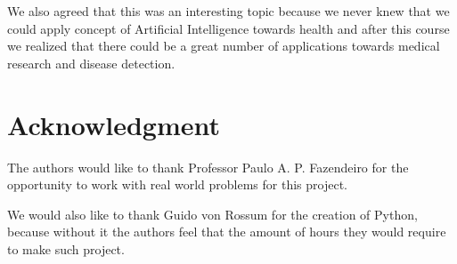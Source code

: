 \documentclass[conference]{IEEEtran}
\begin{document}
We also agreed that this was an interesting topic because we never knew that we
could apply concept of Artificial Intelligence towards health and after this
course we realized that there could be a great number of applications towards
medical research and disease detection.

\section*{Acknowledgment}
The authors would like to thank Professor Paulo A. P. Fazendeiro for the
opportunity to work with real world problems for this project.

We would also like to thank Guido von Rossum for the creation of Python, because
without it the authors feel that the amount of hours they would require to make
such project.
\end{document}
